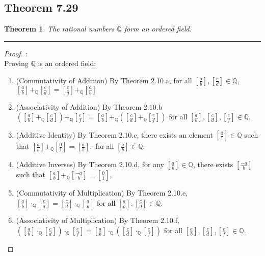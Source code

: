 \documentclass[openany, amssymb, psamsfonts]{amsart}
\newcommand{\bbQ}{\mathbb{Q}}
\newtheorem{thm}{Theorem}[section]
\theoremstyle{definition}
\numberwithin{equation}{section}
\begin{document}
\subsection*{Theorem 7.29}
\begin{thm}
\label{7.29}
	The rational numbers $\bbQ$ form an ordered field.
\end{thm}
\vspace{4pt}     \hrule   \vspace{4pt}
\begin{proof}:\\
Proving $\bbQ$ is an ordered field:
	\begin{enumerate}[{FA}1]
	\item  (Commutativity of Addition) By Theorem 2.10.a, for all $  \left[\frac{a}{b}\right],\left[\frac{c}{d}\right] \in\bbQ$, $\left[\frac{a}{b}\right]+_{\bbQ} \left[\frac{c}{d}\right] =\left[\frac{c}{d}\right]+_{\bbQ}\left[\frac{a}{b}\right]$ 
		\item  (Associativity of Addition)  By Theorem 2.10.b $ \left(\left[\frac{a}{b}\right]+_{\bbQ}\left[\frac{c}{d}\right] \right)+_{\bbQ}\left[\frac{e}{f}\right] = 
  \left[\frac{a}{b}\right]+_{\bbQ}\left( \left[\frac{c}{d}\right] +_{\bbQ} \left[\frac{e}{f}\right]\right) $ for all $ \left[\frac{a}{b}\right],\left[\frac{c}{d}\right] , \left[\frac{e}{f}\right]\in \bbQ.$ 
		\item  (Additive Identity) By Theorem 2.10.c, there exists an element $[\frac{0}{1}] \in \bbQ$ such that $ \left[\frac{a}{b}\right]+_{\bbQ}\left[\frac{0}{1}\right]=\left[\frac{a}{b}\right],$ for all $ \left[\frac{a}{b}\right]\in\bbQ.$
		\item  (Additive Inverses) By Theorem 2.10.d, for any $[\frac{a}{b}] \in \bbQ$, there exists $[\frac{-a}{b}]$ such that $ \left[\frac{a}{b}\right]+_{\bbQ}\left[\frac{-a}{b}\right]=\left[\frac{0}{1}\right],$
		\item  (Commutativity of Multiplication) By Theorem 2.10.e,   $ \left[\frac{a}{b}\right]\cdot_{\bbQ} \left[\frac{c}{d}\right] =\left[\frac{c}{d}\right]\cdot_{\bbQ} \left[\frac{a}{b}\right]$ for all $  \left[\frac{a}{b}\right],\left[\frac{c}{d}\right] \in\bbQ.$
		\item  (Associativity of Multiplication) By Theorem 2.10.f,    $ \left(\left[\frac{a}{b}\right]\cdot_{\bbQ} \left[\frac{c}{d}\right] \right)\cdot_{\bbQ} \left[\frac{e}{f}\right] = 
  \left[\frac{a}{b}\right]\cdot_{\bbQ} \left( \left[\frac{c}{d}\right] \cdot_{\bbQ} \left[\frac{e}{f}\right]\right) $ for all $ \left[\frac{a}{b}\right],\left[\frac{c}{d}\right] , \left[\frac{e}{f}\right]\in \bbQ.$

\end{enumerate}
\end{proof}
\end{document}
